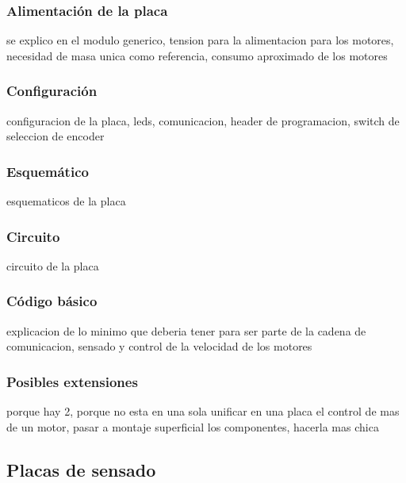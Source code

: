 \subsubsection{Alimentaci\'on de la placa}
\label{h_placas_motorDC_alimentacion}

se explico en el modulo generico, tension para la alimentacion para los motores, necesidad de masa unica como referencia, consumo aproximado de los motores

\subsubsection{Configuraci\'on}
\label{h_placas_motorDC_config}

configuracion de la placa, leds, comunicacion, header de programacion, switch de seleccion de encoder

\subsubsection{Esquem\'atico}
\label{h_placas_motorDC_esquematico}

esquematicos de la placa





\subsubsection{Circuito}
\label{h_placas_motorDC_circuito}

circuito de la placa

\subsubsection{C\'odigo b\'asico}
\label{h_placas_motorDC_codigo}

explicacion de lo minimo que deberia tener para ser parte de la cadena de comunicacion, sensado y control de la velocidad de los motores

\subsubsection{Posibles extensiones}
\label{h_placas_motorDC_extensiones}

porque hay 2, porque no esta en una sola
unificar en una placa el control de mas de un motor, pasar a montaje superficial los componentes, hacerla mas chica

\subsection{Placas de sensado}
\label{h_placas_sensado}

